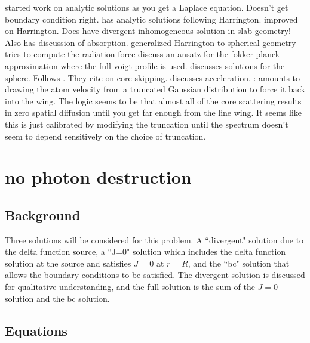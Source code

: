 \documentclass{aastex63}
\begin{document}
\citet{1973MNRAS.162...43H, 1974MNRAS.166..373H} started work on analytic solutions as you get a Laplace equation. Doesn't get boundary condition right.
\citet{1990ApJ...350..216N} has analytic solutions following Harrington.
\citet{1990ApJ...350..216N} improved on Harrington. Does have divergent inhomogeneous solution in slab geometry! Also has discussion of absorption.
\citet{2006ApJ...649...14D} generalized Harrington to spherical geometry
\citet{1976ApJ...208..286W} tries to compute the radiation force
\citet{1994ApJ...427..603R} discuss an ansatz for the fokker-planck approximation where the full voigt profile is used.
\citet{2020arXiv200509692L} discusses solutions for the sphere. Follows \citet{2006ApJ...649...14D}. They cite \citet{2015MNRAS.449.4336S} on core skipping.
\citet{2002ApJ...567..922A,2015MNRAS.449.4336S} discusses acceleration.
\citet{2015MNRAS.449.4336S}: amounts to drawing the atom velocity from a truncated Gaussian distribution to force it back into the wing.  The logic seems to be that almost all of the core scattering results in zero spatial diffusion until you get far enough from the line wing.  It seems like this is just calibrated by modifying the truncation until the spectrum doesn’t seem to depend sensitively on the choice of truncation.  


\section{ no photon destruction }
\label{sec:no_destruction}


\subsection{Background}
\label{subsec:no_destruction:background}

Three solutions will be considered for this problem. A ``divergent" solution due to the delta function source, a ``J=0" solution which includes the delta function solution at the source and satisfies $J=0$ at $r=R$, and the ``bc" solution that allows the boundary conditions to be satisfied. The divergent solution is discussed for qualitative understanding, and the full solution is the sum of the $J=0$ solution and the bc solution.

\subsection{Equations}
\label{subsec:no_destruction:equations}
\end{document}
